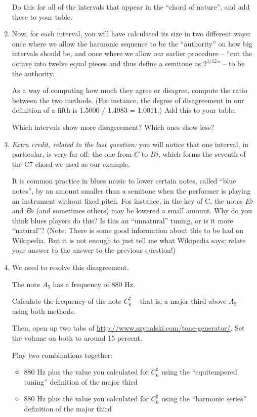 \documentclass[12pt]{article}
\begin{document}
\begin{enumerate}
	Do this for all of the intervals that appear in the ``chord of nature'', and add these to your table.

      \item Now, for each interval, you will have calculated its size in two different ways: once where we allow the harmonic sequence to be the ``authority'' on how big intervals should be,
	and once where we allow our earlier procedure -- ``cut the octave into twelve equal pieces and thus define a semitone as $2^{1/12}$'' -- to be the authority.

	As a way of computing how much they agree or disagree, compute the ratio between the two methods. (For instance, the degree of disagreement in our definition
	of a fifth is 1.5000 / 1.4983 = 1.0011.) Add this to your table.

	Which intervals show more disagreement? Which ones show less?

      \item {\it Extra credit, related to the last question:} you will notice that one interval, in particular, is very far off: the one from $C$ to $B\flat$, which 
	forms the seventh of the C7 chord we used as our example.

	It is common practice in blues music to lower certain notes, called ``blue notes'', by an amount smaller than a semitone when the performer is playing an instrument
	without fixed pitch. For instance, in the key of C, the notes $E\flat$ and $B\flat$ (and sometimes others) may be lowered a small amount. Why do you think blues players
	do this? Is this an ``unnatural'' tuning, or is it more ``natural''? (Note: There is some good information about this to be had on Wikipedia. But it is not enough to 
	just tell me what Wikipedia says; relate your answer to the answer to the previous question!)
	
      \item We need to resolve this disagreement.

	The note $A_5$ has a frequency of 880 Hz.

	Calculate the frequency of the note $C^\sharp_6$ -- that is, a major third above $A_5$ -- using both methods. 
	
	Then, open up two tabs of \url {http://www.szynalski.com/tone-generator/}. Set the volume on both to around 15 percent.

	Play two combinations together:

	\begin{itemize}
	  \item 880 Hz plus the value you calculated for $C^\sharp_6$ using the ``equitempered tuning'' definition of the major third
	  \item 880 Hz plus the value you calculated for $C^\sharp_6$ using the ``harmonic series'' definition of the major third
	\end{itemize}


\end{enumerate}
\end{document}
